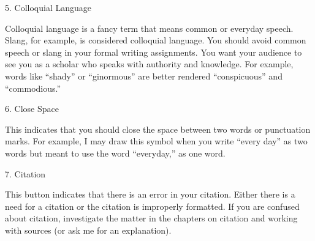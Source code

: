  \begin{center}

\bigskip


{\huge 5. Colloquial Language} \end{center}

Colloquial language is a fancy term that means common or everyday speech. Slang,
for example, is considered colloquial language. You should avoid common speech
or slang in your formal writing assignments. You want your audience to see you
as a scholar who speaks with authority and knowledge. For example, words like
“shady” or “ginormous” are better rendered “conspicuous” and “commodious.”

 \begin{center}
\bigskip


{\huge 6. Close Space} \end{center}

This indicates that you should close the space between two words or punctuation
marks. For example, I may draw this symbol when you write “every day” as two
words but meant to use the word “everyday,” as one word.

 \begin{center}
\bigskip

{\huge 7. Citation} \end{center}

This button indicates that there is an error in your citation. Either there is a
need for a citation or the citation is improperly formatted. If you are confused
about citation, investigate the matter in the chapters on citation and working
with sources (or ask me for an explanation).

